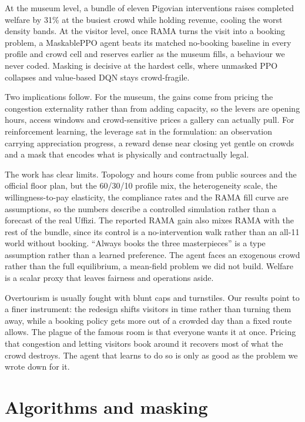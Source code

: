 \documentclass[11pt]{article}
\begin{document}
At the museum level, a bundle of eleven Pigovian interventions raises completed welfare by 31\% at the
busiest crowd while holding revenue, cooling the worst density bands. At the visitor level, once RAMA
turns the visit into a booking problem, a MaskablePPO agent beats its matched no-booking baseline in
every profile and crowd cell and reserves earlier as the museum fills, a behaviour we never coded.
Masking is decisive at the hardest cells, where unmasked PPO collapses and value-based DQN stays
crowd-fragile.

Two implications follow. For the museum, the gains come from pricing the congestion externality rather
than from adding capacity, so the levers are opening hours, access windows and crowd-sensitive prices a
gallery can actually pull. For reinforcement learning, the leverage sat in the formulation: an
observation carrying appreciation progress, a reward dense near closing yet gentle on crowds and a mask
that encodes what is physically and contractually legal.

The work has clear limits. Topology and hours come from public sources and the official floor plan, but
the 60/30/10 profile mix, the heterogeneity scale, the willingness-to-pay elasticity, the compliance
rates and the RAMA fill curve are assumptions, so the numbers describe a controlled simulation rather
than a forecast of the real Uffizi. The reported RAMA gain also mixes RAMA with the rest of the bundle,
since its control is a no-intervention walk rather than an all-11 world without booking. ``Always books
the three masterpieces'' is a type assumption rather than a learned preference. The agent faces an
exogenous crowd rather than the full equilibrium, a mean-field problem we did not build. Welfare is a
scalar proxy that leaves fairness and operations aside.

Overtourism is usually fought with blunt caps and turnstiles. Our results point to a finer instrument:
the redesign shifts visitors in time rather than turning them away, while a booking policy gets more out
of a crowded day than a fixed route allows. The plague of the famous room is that everyone wants it at
once. Pricing that congestion and letting visitors book around it recovers most of what the crowd
destroys. The agent that learns to do so is only as good as the problem we wrote down for it.

\clearpage
\appendix

\section{Algorithms and masking}
\label{app:algos}
\end{document}

